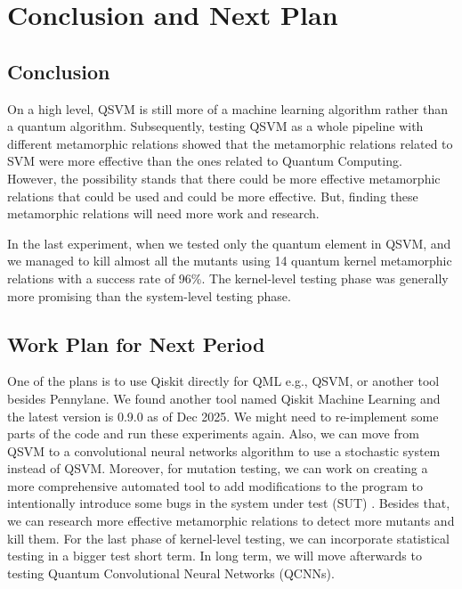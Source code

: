 \documentclass[12pt,a4paper]{article}
\begin{document}
	\section{Conclusion and Next Plan}
	\label{sec:conclusion}
	
	\subsection{Conclusion}
	
	On a high level, QSVM is still more of a machine learning algorithm rather than a quantum algorithm. Subsequently, testing QSVM as a whole pipeline with different metamorphic relations showed that the metamorphic relations related to SVM were more effective than the ones related to Quantum Computing. However, the possibility stands that there could be more effective metamorphic relations that could be used and could be more effective. But, finding these metamorphic relations will need more work and research. 
	
	In the last experiment, when we tested only the quantum element in QSVM, and we managed to kill almost all the mutants using 14 quantum kernel metamorphic relations with a success rate of 96\%. The kernel-level testing phase was generally more promising than the system-level testing phase.
		
	\subsection{Work Plan for Next Period}
	\label{sec:next-plan}
	
	One of the plans is to use Qiskit directly for QML e.g., QSVM, or another tool besides Pennylane. We found another tool named Qiskit Machine Learning and the latest version is 0.9.0 as of Dec 2025. We might need to re-implement some parts of the code and run these experiments again. Also, we can move from QSVM to a convolutional neural networks algorithm to use a stochastic system instead of QSVM. Moreover, for mutation testing, we can work on creating a more comprehensive automated tool to add modifications to the program to intentionally introduce some bugs in the system under test (SUT) \cite{qMutphyFortunato}. Besides that, we can research more effective metamorphic relations to detect more mutants and kill them. For the last phase of kernel-level testing, we can incorporate statistical testing in a bigger test short term. In long term, we will move afterwards to testing Quantum Convolutional Neural Networks (QCNNs). 
	
\end{document}
